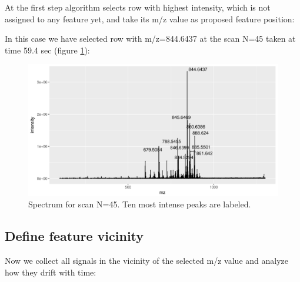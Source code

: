 \documentclass[]{article}
\newenvironment{Shaded}{\begin{snugshade}}{\end{snugshade}}
\newcommand{\KeywordTok}[1]{\textcolor[rgb]{0.13,0.29,0.53}{\textbf{#1}}}
\newcommand{\OperatorTok}[1]{\textcolor[rgb]{0.81,0.36,0.00}{\textbf{#1}}}
\newcommand{\NormalTok}[1]{#1}
\begin{document}
At the first step algorithm selects row with highest intensity, which is
not assigned to any feature yet, and take its m/z value as proposed
feature position:

\begin{Shaded}
\end{Shaded}

In this case we have selected row with m/z=844.6437 at the scan N=45
taken at time 59.4 sec (figure \ref{fig:scan.844}):

\begin{Shaded}
\end{Shaded}

\begin{figure}[H]
\begin{center}
\includegraphics{Supplementary_document_files/figure-latex/ion.plots-1.pdf}
\caption{Spectrum for scan N=45. Ten most intense peaks are labeled.}
\label{fig:scan.844}
\end{center}
\end{figure}

\subsection{Define feature vicinity}
Now we collect all signals in the vicinity of the selected m/z
value and analyze how they drift with time:
\end{document}
